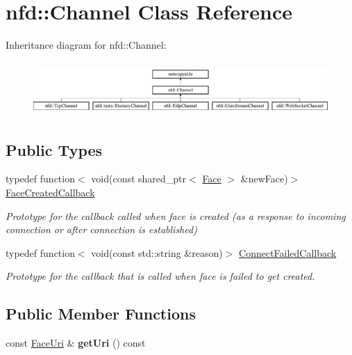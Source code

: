 \hypertarget{classnfd_1_1Channel}{}\section{nfd\+:\+:Channel Class Reference}
\label{classnfd_1_1Channel}
Inheritance diagram for nfd\+:\+:Channel\+:\begin{figure}[H]
\begin{center}
\leavevmode
\includegraphics[height=2.061350cm]{classnfd_1_1Channel}
\end{center}
\end{figure}
\subsection*{Public Types}
\begin{DoxyCompactItemize}
\item 
typedef function$<$ void(const shared\+\_\+ptr$<$ \hyperlink{classnfd_1_1Face}{Face} $>$ \&new\+Face)$>$ \hyperlink{classnfd_1_1Channel_a47f1a8874228ad9dfa38b4e96f6f8d57}{Face\+Created\+Callback}\hypertarget{classnfd_1_1Channel_a47f1a8874228ad9dfa38b4e96f6f8d57}{}\label{classnfd_1_1Channel_a47f1a8874228ad9dfa38b4e96f6f8d57}

\begin{DoxyCompactList}\small\item\em Prototype for the callback called when face is created (as a response to incoming connection or after connection is established) \end{DoxyCompactList}\item 
typedef function$<$ void(const std\+::string \&reason)$>$ \hyperlink{classnfd_1_1Channel_a090bac376b438fb150ce740c2839375b}{Connect\+Failed\+Callback}\hypertarget{classnfd_1_1Channel_a090bac376b438fb150ce740c2839375b}{}\label{classnfd_1_1Channel_a090bac376b438fb150ce740c2839375b}

\begin{DoxyCompactList}\small\item\em Prototype for the callback that is called when face is failed to get created. \end{DoxyCompactList}\end{DoxyCompactItemize}
\subsection*{Public Member Functions}
\begin{DoxyCompactItemize}
\item 
const \hyperlink{classndn_1_1util_1_1FaceUri}{Face\+Uri} \& {\bfseries get\+Uri} () const\hypertarget{classnfd_1_1Channel_ab0a1820baae0960447bf8595850a26d1}{}\label{classnfd_1_1Channel_ab0a1820baae0960447bf8595850a26d1}

\end{DoxyCompactItemize}
